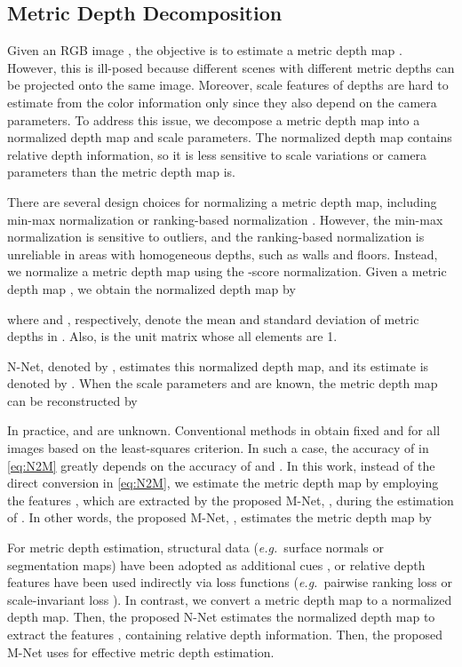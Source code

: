 \documentclass[runningheads]{llncs}
\newcommand{\eg}{\textit{e.g.}}
\begin{document}
\subsection{Metric Depth Decomposition}
\label{sec:Metric_Depth_Decomposition}

Given an RGB image , the objective is to estimate a metric depth map . However, this is ill-posed because different scenes with different metric depths can be projected onto the same image. Moreover, scale features of depths are hard to estimate from the color information only since they also depend on the camera parameters. To address this issue, we decompose a metric depth map  into a normalized depth map  and scale parameters. The normalized depth map  contains relative depth information, so it is less sensitive to scale variations or camera parameters than the metric depth map  is.

There are several design choices for normalizing a metric depth map, including min-max normalization or ranking-based normalization \cite{han2011data}. However, the min-max normalization is sensitive to outliers, and the ranking-based normalization is unreliable in areas with homogeneous depths, such as walls and floors. Instead, we normalize a metric depth map using the -score normalization. Given a metric depth map , we obtain the normalized depth map  by

where  and , respectively, denote the mean and standard deviation of metric depths in . Also,  is the unit matrix whose all elements are 1.

N-Net, denoted by , estimates this normalized depth map, and its estimate is denoted by . When the scale parameters  and  are known, the metric depth map  can be reconstructed by

In practice,  and  are unknown. Conventional methods in \cite{ranftl2020, lienen2021monocular, ranftl2021vision} obtain fixed  and  for all images based on the least-squares criterion. In such a case, the accuracy of  in \eqref{eq:N2M} greatly depends on the accuracy of  and . In this work, instead of the direct conversion in \eqref{eq:N2M}, we estimate the metric depth map by employing the features , which are extracted by the proposed M-Net, , during the estimation of . In other words, the proposed M-Net, , estimates the metric depth map by


For metric depth estimation, structural data (\eg\ surface normals or segmentation maps) have been adopted as additional cues \cite{eigen2015predicting, qi2018geonet, liu2019end, lee2021learning}, or relative depth features have been used indirectly via loss functions (\eg\ pairwise ranking loss \cite{chen2016single} or scale-invariant loss \cite{eigen2014depth, lee2019big, bhat2021adabins}). In contrast, we convert a metric depth map to a normalized depth map. Then, the proposed N-Net  estimates the normalized depth map to extract the features , containing relative depth information. Then, the proposed M-Net uses  for effective metric depth estimation.
\end{document}
